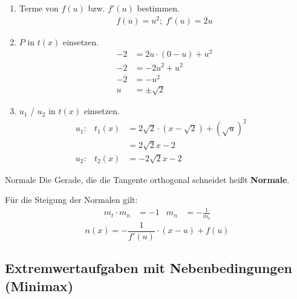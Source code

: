 \documentclass{article}
\begin{document}
\begin{enumerate}
    \item Terme von $f(u)$ bzw. $f'(u)$ bestimmen.
    \begin{align*}
        f(u)=u^2;\;f'(u)=2u
    \end{align*}
    \item $P$ in $t(x)$ einsetzen.
    \begin{align*}
        -2 &= 2u\cdot (0-u)+u^2 \\
        -2 &= -2u^2 +u^2 \\
        -2 &= -u^2 \\
        u &= \pm \sqrt{2}
    \end{align*}
    \item $u_1$ / $u_2$ in $t(x)$ einsetzen.
    \begin{align*}
        &u_1: & t_1(x) &= 2\sqrt{2} \cdot (x-\sqrt{2}) + \left(\sqrt{u}\right)^2  &&\\
        & & &= 2\sqrt{2} x -2 &&\\
        & u_2: & t_2(x) &= -2\sqrt{2} x -2 &&
    \end{align*}
\end{enumerate}
\begin{boxx}[Red]{Normale}
    Die Gerade, die die Tangente orthogonal schneidet heißt \textbf{Normale}.

    Für die Steigung der Normalen gilt:
    \begin{align*}
        m_t \cdot m_n &= -1  & m_n &= -\frac{1}{m_t}
    \end{align*}
    \[n(x) = -\frac{1}{f'(u)}\cdot (x-u)+f(u)\]
\end{boxx}
\subsection{Extremwertaufgaben mit Nebenbedingungen (Minimax)}
\end{document}
